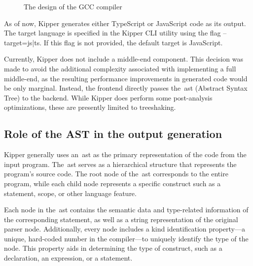 \begin{figure}[h!]
	\centering
	\def\stackalignment{r}
	\caption{The design of the GCC compiler}
	\label{fig:implementation:gcccompiler}
\end{figure}

As of now, Kipper generates either TypeScript or JavaScript code as its output. The target language is specified in the Kipper CLI utility using the flag --target={js|ts}. If this flag is not provided, the default target is JavaScript.

Currently, Kipper does not include a middle-end component. This decision was made to avoid the additional complexity associated with implementing a full middle-end, as the resulting performance improvements in generated code would be only marginal. Instead, the frontend directly passes the~\acrshort{ast} (Abstract Syntax Tree) to the backend. While Kipper does perform some post-analysis optimizations, these are presently limited to treeshaking.

\subsection{Role of the AST in the output generation}

Kipper generally uses an~\acrshort{ast} as the primary representation of the code from the input program. The~\acrshort{ast} serves as a hierarchical structure that represents the program's source code. The root node of the~\acrshort{ast} corresponds to the entire program, while each child node represents a specific construct such as a statement, scope, or other language feature.

Each node in the~\acrshort{ast} contains the semantic data and type-related information of the corresponding statement, as well as a string representation of the original parser node. Additionally, every node includes a kind identification property—a unique, hard-coded number in the compiler—to uniquely identify the type of the node. This property aids in determining the type of construct, such as a declaration, an expression, or a statement.

